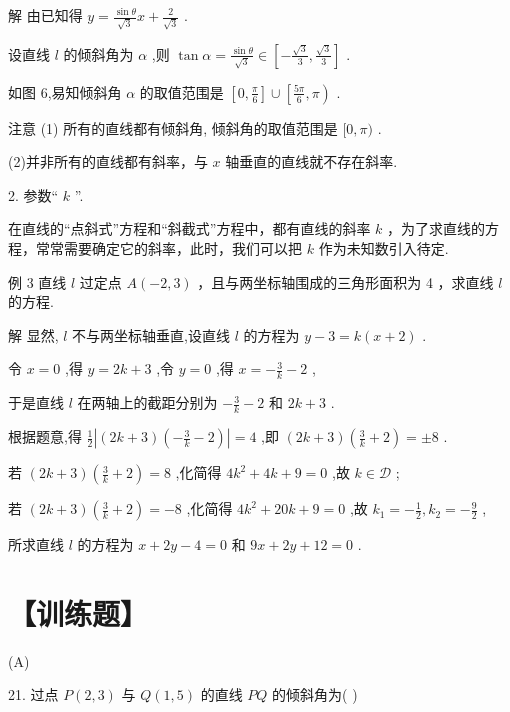 \documentclass[10pt]{article}
\begin{document}
解 由已知得 \(y = \frac{\sin \theta }{\sqrt{3}}x + \frac{2}{\sqrt{3}}\) .

设直线 \(l\) 的倾斜角为 \(\alpha\) ,则 \(\tan \alpha  = \frac{\sin \theta }{\sqrt{3}} \in  \left\lbrack  {-\frac{\sqrt{3}}{3},\frac{\sqrt{3}}{3}}\right\rbrack\) .

如图 6,易知倾斜角 \(\alpha\) 的取值范围是 \(\left\lbrack  {0,\frac{\pi }{6}}\right\rbrack   \cup  \left\lbrack  {\frac{5\pi }{6},\pi }\right)\) .

注意 (1) 所有的直线都有倾斜角, 倾斜角的取值范围是 \(\lbrack 0,\pi )\) .

(2)并非所有的直线都有斜率，与 \(x\) 轴垂直的直线就不存在斜率.

2. 参数“ \(k\) ”.

在直线的“点斜式”方程和“斜截式”方程中，都有直线的斜率 \(k\) ，为了求直线的方程，常常需要确定它的斜率，此时，我们可以把 \(k\) 作为未知数引入待定.

例 3 直线 \(l\) 过定点 \(A\left( {-2,3}\right)\) ，且与两坐标轴围成的三角形面积为 4 ，求直线 \(l\) 的方程.

解 显然, \(l\) 不与两坐标轴垂直,设直线 \(l\) 的方程为 \(y - 3 = k\left( {x + 2}\right)\) .

令 \(x = 0\) ,得 \(y = {2k} + 3\) ,令 \(y = 0\) ,得 \(x =  - \frac{3}{k} - 2\) ,

于是直线 \(l\) 在两轴上的截距分别为 \(- \frac{3}{k} - 2\) 和 \({2k} + 3\) .

根据题意,得 \(\frac{1}{2}\left| {\left( {{2k} + 3}\right) \left( {-\frac{3}{k} - 2}\right) }\right|  = 4\) ,即 \(\left( {{2k} + 3}\right) \left( {\frac{3}{k} + 2}\right)  =  \pm  8\) .

若 \(\left( {{2k} + 3}\right) \left( {\frac{3}{k} + 2}\right)  = 8\) ,化简得 \(4{k}^{2} + {4k} + 9 = 0\) ,故 \(k \in  \mathcal{D}\) ;

若 \(\left( {{2k} + 3}\right) \left( {\frac{3}{k} + 2}\right)  =  - 8\) ,化简得 \(4{k}^{2} + {20k} + 9 = 0\) ,故 \({k}_{1} =  - \frac{1}{2},{k}_{2} =  - \frac{9}{2}\) ,

所求直线 \(l\) 的方程为 \(x + {2y} - 4 = 0\) 和 \({9x} + {2y} + {12} = 0\) .

\section*{【训练题】}

(A)

21. 过点 \(P\left( {2,3}\right)\) 与 \(Q\left( {1,5}\right)\) 的直线 \({PQ}\) 的倾斜角为( )
\end{document}
